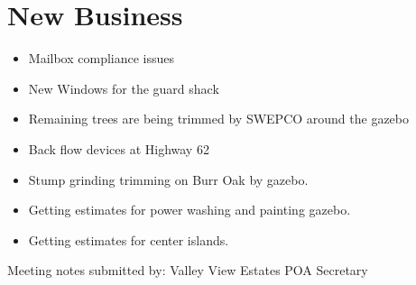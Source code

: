 \documentclass[12pt,a4paper]{article}
\begin{document}
\section*{New Business}
\begin{itemize}
  \item Mailbox compliance issues
  \item New Windows for the guard shack
  \item Remaining trees are being trimmed by SWEPCO around the gazebo
  \item Back flow devices at Highway 62
  \item Stump grinding trimming on Burr Oak by gazebo.
  \item Getting estimates for power washing and painting gazebo.
  \item Getting estimates for center islands.
\end{itemize}

\begin{flushleft}
Meeting notes submitted by:\break{}
\@author\break{}
Valley View Estates POA Secretary
\end{flushleft}
\end{document}
